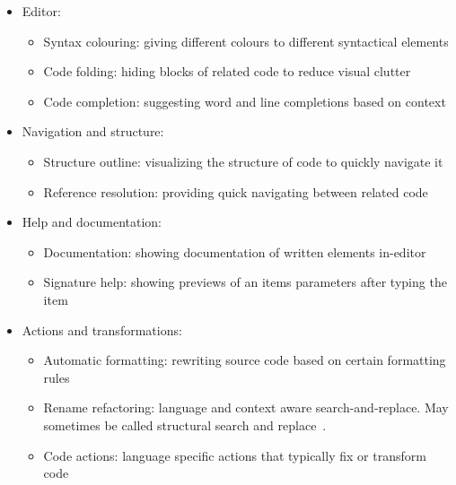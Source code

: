 \begin{itemize}
    \item Editor:
    \begin{itemize}
        \item Syntax colouring: giving different colours to different syntactical elements
        \item Code folding: hiding blocks of related code to reduce visual clutter
        \item Code completion: suggesting word and line completions based on context
    \end{itemize}
    \item Navigation and structure:
    \begin{itemize}
        \item Structure outline: visualizing the structure of code to quickly navigate it
        \item Reference resolution: providing quick navigating between related code
    \end{itemize}
    \item Help and documentation:
    \begin{itemize}
        \item Documentation: showing documentation of written elements in-editor
        \item Signature help: showing previews of an items parameters after typing the item
    \end{itemize}
    \item Actions and transformations:
    \begin{itemize}
        \item Automatic formatting: rewriting source code based on certain formatting rules
        \item Rename refactoring: language and context aware search-and-replace.
              May sometimes be called structural search and replace~\autocite{jetbrains_ssr}.
        \item Code actions: language specific actions that typically fix or transform code~\autocite{lsp_code_actions}
    \end{itemize}

\end{itemize}
